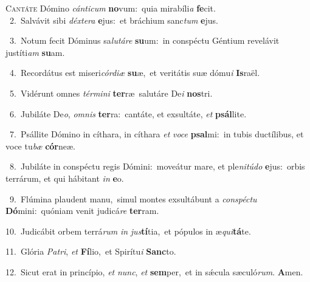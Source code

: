 \lettrine{\initial\textcolor{\initialcolor}{C}}{antáte} Dómino \textit{cán}\-\textit{ti}\textit{cum} \textbf{no}\-vum:~\star quia mirabíli\textit{a} \textbf{fe}\-cit.\\
{\numbfont\textcolor{\numbcolor}{~2.}}~Salvávit sibi \textit{déx}\-\textit{te}\textit{ra} \textbf{e}\-jus:~\star et bráchium sanc\textit{tum} \textbf{e}\-jus.\par
{\numbfont\textcolor{\numbcolor}{~3.}}~Notum fecit Dóminus sa\-\textit{lu}\-\textit{tá}\textit{re} \textbf{su}\-um:~\star in conspéctu Géntium revelávit justíti\textit{am} \textbf{su}\-am.\par
{\numbfont\textcolor{\numbcolor}{~4.}}~Recordátus est miseri\-\textit{cór}\-\textit{di}\textit{æ} \textbf{su}\-æ,~\star et veritátis suæ dómu\textit{i} \textbf{Is}\-raël.\par
{\numbfont\textcolor{\numbcolor}{~5.}}~Vidérunt omnes \textit{tér}\-\textit{mi}\textit{ni} \textbf{ter}\-ræ~\star salutáre De\textit{i} \textbf{nos}\-tri.\par
{\numbfont\textcolor{\numbcolor}{~6.}}~Jubiláte De\-\textit{o}\-, \textit{om}\-\textit{nis} \textbf{ter}\-ra:~\star cantáte, et exsultáte, \textit{et} \textbf{psál}\-lite.\par
{\numbfont\textcolor{\numbcolor}{~7.}}~Psállite Dómino in cíthara, in cíthara \textit{et} \textit{vo}\-\textit{ce} \textbf{psal}\-mi:~\star in tubis ductílibus, et voce tu\textit{bæ} \textbf{cór}\-neæ.\par
{\numbfont\textcolor{\numbcolor}{~8.}}~Jubiláte in conspéctu regis Dómini:~\dagger moveátur mare, et ple\-\textit{ni}\-\textit{tú}\textit{do} \textbf{e}\-jus:~\star orbis terrárum, et qui hábitant \textit{in} \textbf{e}\-o.\par
{\numbfont\textcolor{\numbcolor}{~9.}}~Flúmina plaudent manu,~\dagger simul montes exsultábunt a \textit{con}\-\textit{spéc}\textit{tu} \textbf{Dó}\-mini:~\star quóniam venit judicá\textit{re} \textbf{ter}\-ram.\par
{\numbfont\textcolor{\numbcolor}{10.}}~Judicábit orbem terrá\textit{rum} \textit{in} \textit{jus}\-\textbf{tí}tia,~\star et pópulos in æ\-\textit{qui}\-\textbf{tá}te.\par
{\numbfont\textcolor{\numbcolor}{11.}}~Glória \textit{Pa}\-\textit{tri}, \textit{et} \textbf{Fí}\-lio,~\star et Spirítu\textit{i} \textbf{Sanc}\-to.\par
{\numbfont\textcolor{\numbcolor}{12.}}~Sicut erat in princípio, \textit{et} \textit{nunc}\-, \textit{et} \textbf{sem}\-per,~\star et in sǽcula sæculó\-\textit{rum}\-. \textbf{A}\-men.\par
